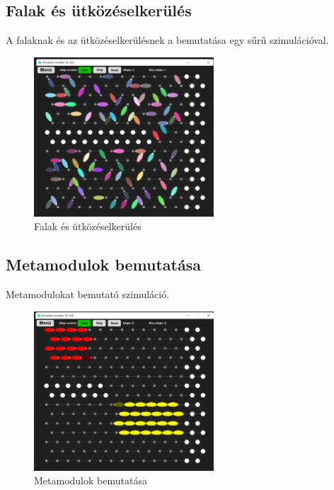 \documentclass[	
  noindent
]{elteikthesis}[2024/04/26]
\begin{document}
      \subsection{Falak és ütközéselkerülés}
        A falaknak és az ütközéselkerülésnek a bemutatása egy sűrű szimulációval.
      \begin{figure}[H]
        \centering
        \includegraphics[width=0.6\textwidth]{images/simulatons/04_wall.png}
        \caption{Falak és ütközéselkerülés}
        \label{fig:04_wall}
      \end{figure}

      \subsection{Metamodulok bemutatása}
      Metamodulokat bemutató szimuláció.
      \begin{figure}[H]
        \centering
        \includegraphics[width=0.6\textwidth]{images/simulatons/05_meta.png}
        \caption{Metamodulok bemutatása}
        \label{fig:05_meta}
      \end{figure}
\end{document}
